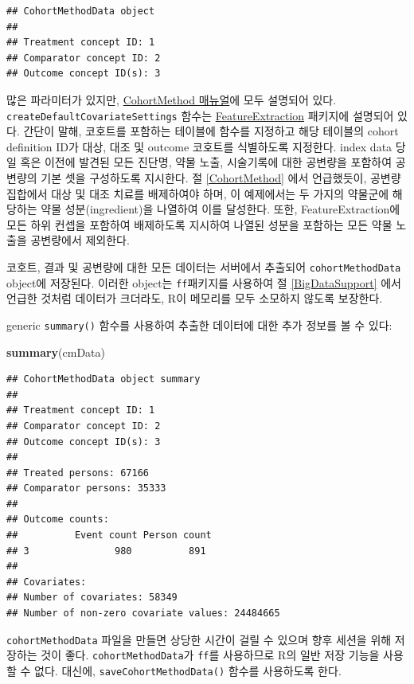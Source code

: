 \documentclass[11pt]{book}
\newenvironment{Shaded}{\begin{snugshade}}{\end{snugshade}}
\newcommand{\KeywordTok}[1]{\textcolor[rgb]{0.13,0.29,0.53}{\textbf{#1}}}
\newcommand{\NormalTok}[1]{#1}
\theoremstyle{definition}
\theoremstyle{definition}
\theoremstyle{definition}
\theoremstyle{remark}
\begin{document}
\begin{verbatim}
## CohortMethodData object
## 
## Treatment concept ID: 1
## Comparator concept ID: 2
## Outcome concept ID(s): 3
\end{verbatim}

많은 파라미터가 있지만,
\href{https://ohdsi.github.io/CohortMethod/reference/}{CohortMethod
매뉴얼}에 모두 설명되어 있다. \texttt{createDefaultCovariateSettings}
함수는
\href{https://ohdsi.github.io/FeatureExtraction/}{FeatureExtraction}
패키지에 설명되어 있다. 간단이 말해, 코호트를 포함하는 테이블에 함수를
지정하고 해당 테이블의 cohort definition ID가 대상, 대조 및 outcome
코호트를 식별하도록 지정한다. index data 당일 혹은 이전에 발견된 모든
진단명, 약물 노출, 시술기록에 대한 공변량을 포함하여 공변량의 기본 셋을
구성하도록 지시한다. 절 \ref{CohortMethod} 에서 언급했듯이, 공변량
집합에서 대상 및 대조 치료를 배제하여야 하며, 이 예제에서는 두 가지의
약물군에 해당하는 약물 성분(ingredient)을 나열하여 이를 달성한다. 또한,
FeatureExtraction에 모든 하위 컨셉을 포함하여 배제하도록 지시하여 나열된
성분을 포함하는 모든 약물 노출을 공변량에서 제외한다.

코호트, 결과 및 공변량에 대한 모든 데이터는 서버에서 추출되어
\texttt{cohortMethodData} object에 저장된다. 이러한 object는
\texttt{ff}패키지를 사용하여 절 \ref{BigDataSupport} 에서 언급한 것처럼
데이터가 크더라도, R이 메모리를 모두 소모하지 않도록 보장한다.

generic \texttt{summary()} 함수를 사용하여 추출한 데이터에 대한 추가
정보를 볼 수 있다:

\begin{Shaded}
\begin{Highlighting}[]
\KeywordTok{summary}\NormalTok{(cmData)}
\end{Highlighting}
\end{Shaded}

\begin{verbatim}
## CohortMethodData object summary
## 
## Treatment concept ID: 1
## Comparator concept ID: 2
## Outcome concept ID(s): 3
## 
## Treated persons: 67166
## Comparator persons: 35333
## 
## Outcome counts:
##          Event count Person count
## 3               980          891
## 
## Covariates:
## Number of covariates: 58349
## Number of non-zero covariate values: 24484665
\end{verbatim}

\texttt{cohortMethodData} 파일을 만들면 상당한 시간이 걸릴 수 있으며
향후 세션을 위해 저장하는 것이 좋다. \texttt{cohortMethodData}가
\texttt{ff}를 사용하므로 R의 일반 저장 기능을 사용할 수 없다. 대신에,
\texttt{saveCohortMethodData()} 함수를 사용하도록 한다.
\end{document}
